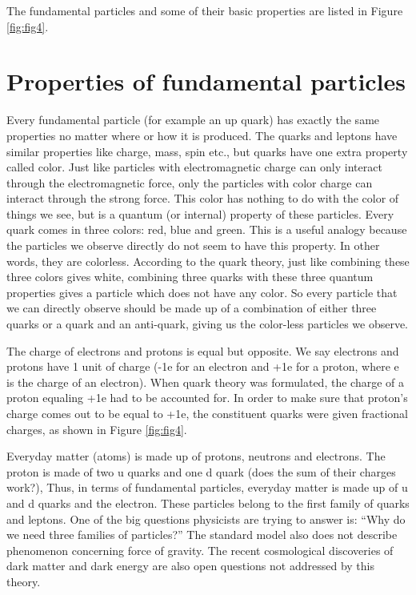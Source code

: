 The fundamental particles and some of their basic properties are listed in 
Figure \ref{fig:fig4}.




\section{Properties of fundamental particles}
Every fundamental particle (for example an up quark) has exactly the same properties no matter where or how it is produced.   The quarks and leptons have similar properties like charge, mass, spin etc., but quarks have one extra property called color. Just like particles with electromagnetic charge can only interact through the electromagnetic force, only the particles with color charge can interact through the strong force. This color has nothing to do with the color of things we see, but is a quantum (or internal) property of these particles. Every quark comes in three colors: red, blue and green. This is a useful analogy because the particles we observe directly do not seem to have this property. In other words, they are colorless. According to the quark theory, just like combining these three colors gives white, combining three quarks with these three quantum properties gives a particle which does not have any color. So every particle that we can directly observe should be made up of a combination of either three quarks or a quark and an anti-quark, giving us the color-less particles we observe. 

The charge of electrons and protons is equal but opposite. We say electrons and protons have 1 unit of charge (-1e for an electron and +1e for a proton, where e is the charge of an electron). When quark theory was formulated, the charge of a proton equaling +1e had to be accounted for. In order to make sure that proton’s charge comes out to be equal to +1e, the constituent quarks were given fractional charges, as shown in Figure \ref{fig:fig4}.

Everyday matter (atoms) is made up of protons, neutrons and electrons. The proton is made of two u quarks and one d quark (does the sum of their charges work?), Thus, in terms of fundamental particles,  everyday matter is made up of u and d quarks and the electron.  These particles belong to the first family of quarks and leptons. One of the big questions physicists are trying to answer is: 
``Why do we need three families of particles?” The standard model also does not describe phenomenon concerning force of gravity. The recent cosmological discoveries of dark matter and dark energy are also open questions not addressed by this theory. 

